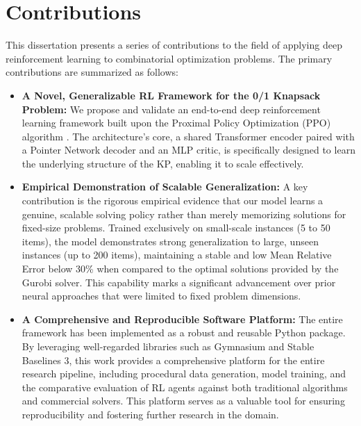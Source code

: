 \section{Contributions}

This dissertation presents a series of contributions to the field of applying deep reinforcement learning to combinatorial optimization problems. The primary contributions are summarized as follows:

\begin{itemize}
    \item \textbf{A Novel, Generalizable RL Framework for the 0/1 Knapsack Problem:} We propose and validate an end-to-end deep reinforcement learning framework built upon the Proximal Policy Optimization (PPO) algorithm \cite{schulmanProximalPolicyOptimization2017}. The architecture's core, a shared Transformer encoder \cite{koolAttentionLearnSolve2019a} paired with a Pointer Network decoder \cite{belloNeuralCombinatorialOptimization2017} and an MLP critic, is specifically designed to learn the underlying structure of the KP, enabling it to scale effectively.

    \item \textbf{Empirical Demonstration of Scalable Generalization:} A key contribution is the rigorous empirical evidence that our model learns a genuine, scalable solving policy rather than merely memorizing solutions for fixed-size problems. Trained exclusively on small-scale instances (5 to 50 items), the model demonstrates strong generalization to large, unseen instances (up to 200 items), maintaining a stable and low Mean Relative Error below 30\% when compared to the optimal solutions provided by the Gurobi solver. This capability marks a significant advancement over prior neural approaches that were limited to fixed problem dimensions.

    \item \textbf{A Comprehensive and Reproducible Software Platform:} The entire framework has been implemented as a robust and reusable Python package. By leveraging well-regarded libraries such as Gymnasium and Stable Baselines 3, this work provides a comprehensive platform for the entire research pipeline, including procedural data generation, model training, and the comparative evaluation of RL agents against both traditional algorithms and commercial solvers. This platform serves as a valuable tool for ensuring reproducibility and fostering further research in the domain.
\end{itemize}
